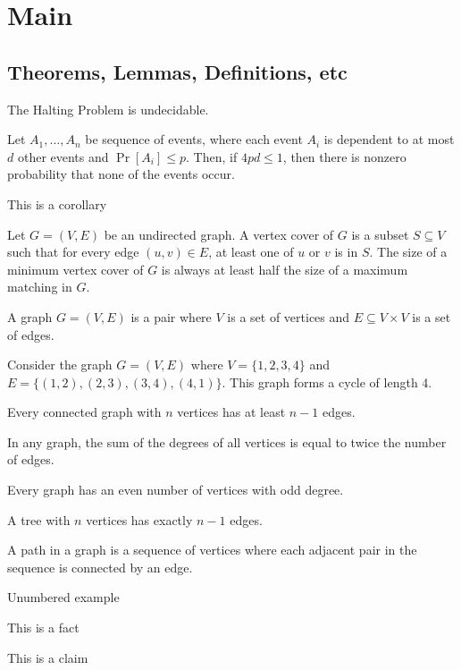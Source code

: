 \section{Main}
\subsection{Theorems, Lemmas, Definitions, etc}
\begin{theorem}[Halting]
    The Halting Problem is undecidable.
\end{theorem}
\begin{lemma}
Let $A_1, \dots, A_n$ be sequence of events, where each event $A_i$ is dependent to at most $d$ other events and $\Pr[A_i] \le p$. 
Then, if $4pd \le 1$, then there is nonzero probability that none of the events occur.
\end{lemma}
\begin{corollary}
This is a corollary
\end{corollary}
\begin{proposition}
Let $G = (V, E)$ be an undirected graph. A vertex cover of $G$ is a subset $S \subseteq V$ such that for every edge $(u, v) \in E$, at least one of $u$ or $v$ is in $S$. The size of a minimum vertex cover of $G$ is always at least half the size of a maximum matching in $G$.
\end{proposition}

\begin{definition}
    A graph $G = (V, E)$ is a pair where $V$ is a set of vertices and $E \subseteq V \times V$ is a set of edges.
\end{definition}
\begin{example}
    Consider the graph $G = (V, E)$ where $V = \{1, 2, 3, 4\}$ and $E = \{(1,2), (2,3), (3,4), (4,1)\}$. This graph forms a cycle of length 4.
\end{example}
\begin{theorem*}
    Every connected graph with $n$ vertices has at least $n-1$ edges.
\end{theorem*}
\begin{lemma*}
    In any graph, the sum of the degrees of all vertices is equal to twice the number of edges.
\end{lemma*}
\begin{corollary*}
    Every graph has an even number of vertices with odd degree.
\end{corollary*}
\begin{proposition*}
    A tree with $n$ vertices has exactly $n-1$ edges.
\end{proposition*}
\begin{definition*}
    A path in a graph is a sequence of vertices where each adjacent pair in the sequence is connected by an edge.
\end{definition*}
\begin{example*}
Unumbered example
\end{example*}
\begin{fact}
This is a fact
\end{fact}
\begin{claim}
This is a claim
\end{claim}

